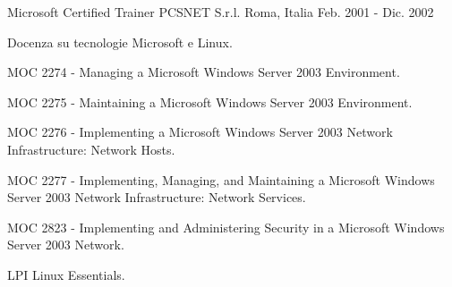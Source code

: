 \begin{cventries}
  \cventry
    {Microsoft Certified Trainer} %
    {PCSNET S.r.l.} %
    {Roma, Italia} %
    {Feb. 2001 - Dic. 2002} %
    {
      \begin{cvitems} %
        \item {Docenza su tecnologie Microsoft e Linux.}
        \item {MOC 2274 - Managing a Microsoft Windows Server 2003 Environment.}
        \item {MOC 2275 - Maintaining a Microsoft Windows Server 2003 Environment.}
        \item {MOC 2276 - Implementing a Microsoft Windows Server 2003 Network Infrastructure: Network Hosts.}
        \item {MOC 2277 - Implementing, Managing, and Maintaining a Microsoft Windows Server 2003 Network Infrastructure: Network Services.}
        \item {MOC 2823 - Implementing and Administering Security in a Microsoft Windows Server 2003 Network.}
        \item {LPI Linux Essentials.}
      \end{cvitems}
    }

\end{cventries}
